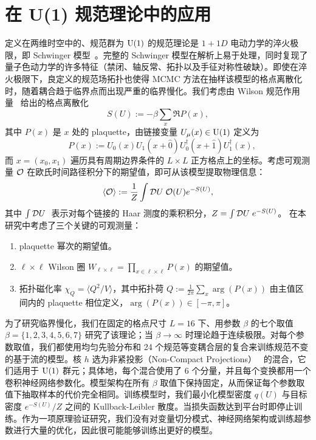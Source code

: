 \section{在 U(1) 规范理论中的应用}
定义在两维时空中的、规范群为 $\mathrm{U}(1)$ 的规范理论是 $1+1D$ 电动力学的淬火极限，即 Schwinger 模型~\cite{Schwinger:1962tp}。完整的 Schwinger 模型在解析上易于处理，同时复现了量子色动力学的许多特征（禁闭、轴反常、拓扑以及手征对称性破缺）。即使在淬火极限下，良定义的规范场拓扑也使得 MCMC 方法在抽样该模型的格点离散化时，随着耦合趋于临界点而出现严重的临界慢化。我们考虑由 Wilson 规范作用量~\cite{Wilson:1974sk} 给出的格点离散化
%
\begin{equation}\label{eq:action}
    S(U) := -\beta \sum_x \Re P(x),
\end{equation}
%
其中 $P(x)$ 是 $x$ 处的 plaquette，由链接变量 $U_\mu(x) \in \mathrm{U}(1)$ 定义为
%
\begin{equation} \label{eq:plaquette}
\quad P(x) := U_{0}(x) U_1(x+\hat{0}) U^\dagger_{0}(x+\hat{1}) U^\dagger_{1}(x),
\end{equation}
%
而 $x = (x_0, x_1)$ 遍历具有周期边界条件的 $L \times L$ 正方格点上的坐标。考虑可观测量 $\mathcal{O}$ 在欧氏时间路径积分下的期望值，即可从该模型提取物理信息：
\begin{equation}
  \left< \mathcal{O} \right> := \frac{1}{Z} \int \mathcal{D}{U}\; \mathcal{O}(U) e^{-S(U)},
\end{equation}
其中 $\int \mathcal{D}{U}\;$ 表示对每个链接的 Haar 测度的乘积积分，$Z=\int\mathcal{D}{U}\; e^{-S(U)}$。
在本研究中考虑了三个关键的可观测量：
%
\begin{enumerate}

    \item plaquette 幂次的期望值。

    \item $\ell \times \ell$ Wilson 圈 $W_{\ell \times \ell} = \prod_{x \in \ell \times \ell} P(x)$ 的期望值。

    \item 拓扑磁化率 $\chi_Q = \langle Q^2 / V \rangle$，其中拓扑荷 $Q := \frac{1}{2\pi} \sum_x \arg\left(P(x)\right)$ 由主值区间内的 plaquette 相位定义，$\arg\left(P(x)\right) \in [-\pi, \pi]$。

\end{enumerate}

为了研究临界慢化，我们在固定的格点尺寸 $L = 16$ 下、用参数 $\beta$ 的七个取值 $\beta = \{ 1,2,3,4,5,6,7 \}$ 研究了该理论；当 $\beta \rightarrow \infty$ 时理论趋于连续极限。对每个参数取值，我们都使用均匀先验分布和 24 个规范等变耦合层的复合来训练规范不变的基于流的模型。核 $h$ 选为非紧投影（Non-Compact Projections）~\cite{rezende2020normalizing} 的混合，它们适用于 $\mathrm{U}(1)$ 群元；具体地，每个混合使用了 6 个分量，并且每个变换都用一个卷积神经网络参数化。模型架构在所有 $\beta$ 取值下保持固定，从而保证每个参数取值下抽取样本的代价完全相同。训练模型时，我们最小化模型密度 $q(U)$ 与目标密度 $e^{-S(U)} / Z$ 之间的 Kullback-Leibler 散度。当损失函数达到平台时即停止训练。作为一项原理验证研究，我们没有对变量切分模式、神经网络架构或训练超参数进行大量的优化，因此很可能能够训练出更好的模型。

